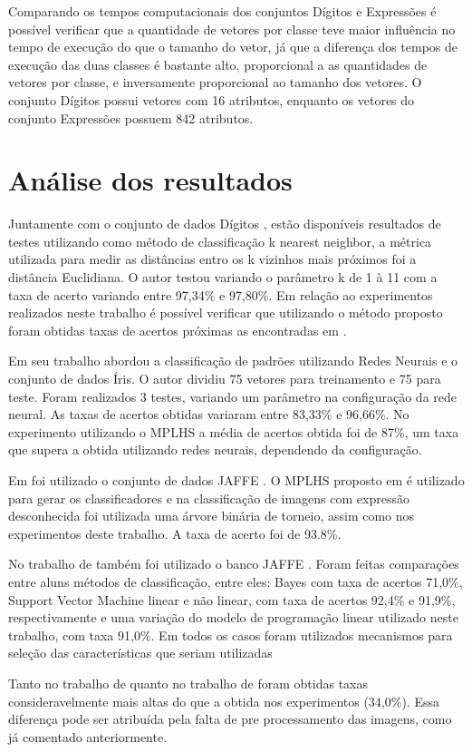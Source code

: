 Comparando os tempos computacionais dos conjuntos Dígitos e Expressões é possível verificar que a quantidade de vetores por classe teve maior influência no tempo de execução do que o tamanho do vetor, já que a diferença dos tempos de execução das duas classes é bastante alto, proporcional a as quantidades de vetores por classe, e inversamente proporcional ao tamanho dos vetores. O conjunto Dígitos possui vetores com 16 atributos, enquanto os vetores do conjunto Expressões possuem  842 atributos.

\section{Análise dos resultados}

Juntamente com o conjunto de dados Dígitos \cite{Digitos}, estão disponíveis resultados de testes utilizando como método de classificação k nearest neighbor, a métrica utilizada para medir as distâncias entro os k vizinhos mais próximos foi a distância Euclidiana. O autor testou variando o parâmetro k de 1 à 11 com a taxa de acerto variando entre 97,34\% e 97,80\%. Em relação ao experimentos realizados neste trabalho é possível verificar que utilizando o método proposto foram obtidas taxas de acertos próximas as encontradas em .

Em seu trabalho  abordou a classificação de padrões utilizando Redes Neurais e o conjunto de dados Íris. O autor dividiu 75 vetores para treinamento e 75 para teste. Foram realizados 3 testes, variando um parâmetro na configuração da rede neural. As taxas de acertos obtidas variaram entre 83,33\% e 96,66\%. No experimento utilizando o MPLHS a média de acertos obtida foi de 87\%, um taxa que supera a obtida utilizando redes neurais, dependendo da configuração.

Em  foi utilizado o conjunto de dados JAFFE \cite{Jaffe}. O MPLHS proposto em  é utilizado para gerar os classificadores e na classificação de imagens com expressão desconhecida foi utilizada uma árvore binária de torneio, assim como nos experimentos deste trabalho. A taxa de acerto foi de 93.8\%.

No trabalho de  também foi utilizado o banco JAFFE \cite{Jaffe}. Foram feitas comparações entre aluns métodos de classificação, entre eles: Bayes com taxa de acertos 71,0\%, Support Vector Machine linear e não linear, com taxa de acertos 92,4\% e 91,9\%, respectivamente e uma variação do modelo de programação linear utilizado neste trabalho, com taxa 91,0\%. Em todos os casos foram utilizados mecanismos para seleção das características que seriam utilizadas
 
Tanto no trabalho de  quanto no trabalho de  foram obtidas taxas consideravelmente mais altas do que a obtida nos experimentos (34,0\%). Essa diferença pode ser atribuída pela falta de pre processamento das imagens, como já comentado anteriormente.

